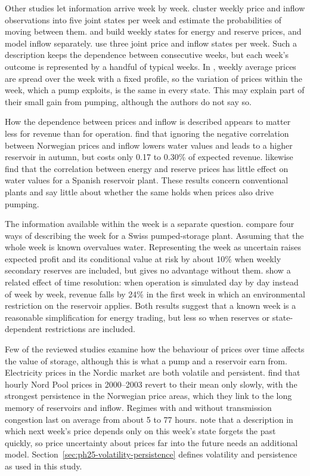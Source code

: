 Other studies let information arrive week by week. \citet{alic2023optimal}
cluster weekly price and inflow observations into five joint states per
week and estimate the probabilities of moving between them.
\citet{helseth2017iet} and \citet{helseth2016} build weekly states for
energy and reserve prices, and \citet{helseth2016} model inflow
separately. \citet{bore2026assessing} use three joint price and inflow
states per week. Such a description keeps the dependence between
consecutive weeks, but each week's outcome is represented by a handful
of typical weeks. In \citet{alic2023optimal}, weekly average prices are
spread over the week with a fixed profile, so the variation of prices
within the week, which a pump exploits, is the same in every state. This
may explain part of their small gain from pumping, although the authors
do not say so.

How the dependence between prices and inflow is described appears to
matter less for revenue than for operation. \citet{kleiven2023} find
that ignoring the negative correlation between Norwegian prices and
inflow lowers water values and leads to a higher reservoir in autumn,
but costs only 0.17 to 0.30\% of expected revenue. \citet{perezdiaz2020medium}
likewise find that the correlation between energy and reserve prices has
little effect on water values for a Spanish reservoir plant. These
results concern conventional plants and say little about whether the
same holds when prices also drive pumping.

The information available within the week is a separate question.
\citet{abgottspon2014} compare four ways of describing the week for a
Swiss pumped-storage plant. Assuming that the whole week is known
overvalues water. Representing the week as uncertain raises expected
profit and its conditional value at risk by about 10\% when weekly
secondary reserves are included, but gives no advantage without them.
\citet{alic2023optimal} show a related effect of time resolution: when
operation is simulated day by day instead of week by week, revenue falls
by 24\% in the first week in which an environmental restriction on the
reservoir applies. Both results suggest that a known week is a
reasonable simplification for energy trading, but less so when reserves
or state-dependent restrictions are included.

Few of the reviewed studies examine how the behaviour of prices over
time affects the value of storage, although this is what a pump and a
reservoir earn from. Electricity prices in the Nordic market are both
volatile and persistent. \citet{haldrup2006regime} find that hourly
Nord Pool prices in 2000--2003 revert to their mean only slowly, with
the strongest persistence in the Norwegian price areas, which they link
to the long memory of reservoirs and inflow. Regimes with and without
transmission congestion last on average from about 5 to 77 hours.
\citet{mo2001} note that a description in which next week's price
depends only on this week's state forgets the past quickly, so price
uncertainty about prices far into the future needs an additional model.
Section~\ref{sec:ph25-volatility-persistence} defines volatility and
persistence as used in this study.

